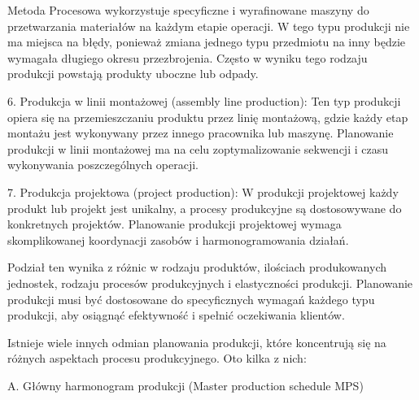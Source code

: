 Metoda Procesowa wykorzystuje specyficzne i wyrafinowane maszyny do przetwarzania materiałów na każdym etapie operacji. W tego typu produkcji nie ma miejsca na błędy, ponieważ zmiana jednego typu przedmiotu na inny będzie wymagała długiego okresu przezbrojenia. Często w wyniku tego rodzaju produkcji powstają produkty uboczne lub odpady.

    
6. Produkcja w linii montażowej (assembly line production): Ten typ produkcji opiera się na przemieszczaniu produktu przez linię montażową, gdzie każdy etap montażu jest wykonywany przez innego pracownika lub maszynę. Planowanie produkcji w linii montażowej ma na celu zoptymalizowanie sekwencji i czasu wykonywania poszczególnych operacji.
    
7. Produkcja projektowa (project production): W produkcji projektowej każdy produkt lub projekt jest unikalny, a procesy produkcyjne są dostosowywane do konkretnych projektów. Planowanie produkcji projektowej wymaga skomplikowanej koordynacji zasobów i harmonogramowania działań.
    

Podział ten wynika z różnic w rodzaju produktów, ilościach produkowanych jednostek, rodzaju procesów produkcyjnych i elastyczności produkcji. Planowanie produkcji musi być dostosowane do specyficznych wymagań każdego typu produkcji, aby osiągnąć efektywność i spełnić oczekiwania klientów.


Istnieje wiele innych odmian planowania produkcji, które koncentrują się na różnych aspektach procesu produkcyjnego. Oto kilka z nich:

 A.  Główny harmonogram produkcji (Master production schedule MPS)

